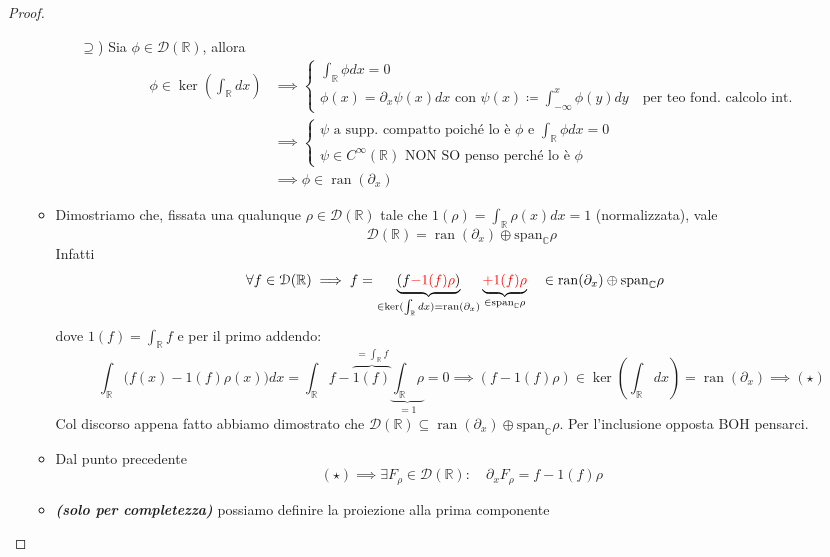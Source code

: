 \documentclass[a4paper,10pt]{article}
\theoremstyle{definition}
\DeclareMathOperator*{\ran}{ran}
\newcommand{\re}{\mathbb{R}} %
\newcommand{\im}{\mathbb{C}} %
\theoremstyle{indentdefinition}
\theoremstyle{indenttheorem}
\theoremstyle{myremark}
\theoremstyle{indentgeneral}
\begin{document}
\begin{proof}
\begin{itemize}
\begin{itemize}
\begin{itemize}
            \item[\underline{$\supseteq$})]  Sia $\phi\in \mathcal{D}(\re)$, allora
            \begin{align*}
                \phi\in\ker(\int_\re dx)&\implies\begin{cases}
                    \int_\re\phi dx=0\\
                    \phi(x)=\partial_x\psi(x)dx \text{ con }\psi(x)\coloneqq\int_{-\infty}^x\phi(y)dy \quad \text{per teo fond. calcolo int.}
                \end{cases}\\
                &\implies\begin{cases}
                    \psi \text{ a supp. compatto poiché lo è $\phi$ e $\int_\re\phi dx=0$}\\
                    \psi \in C^\infty(\re)\text{ NON SO penso perché lo è $\phi$}
                \end{cases}\\
                &\implies\phi\in\ran(\partial_x)
            \end{align*}
        \end{itemize}
        \item Dimostriamo che, fissata una qualunque $\rho\in\mathcal{D}(\re)$ tale che $1(\rho)=\int_\re\rho(x)dx=1$ (normalizzata), vale
        $$\boxed{\mathcal{D}(\re)=\ran(\partial_x)\oplus\text{span}_\im\rho}$$
        Infatti
        \begin{align*}
            \forall f\in\mathcal{D}(\re)&\implies f=\underbrace{(f\textcolor{red}{-1(f)\rho})}_{\in\ker(\int_\re dx)=\ran(\partial_x)}\underbrace{\textcolor{red}{+1(f)\rho}}_{\in\text{span}_\im\rho}\quad\in \ran(\partial_x)\oplus\text{span}_\im\rho
        \end{align*}
        dove $1(f)=\int_\re f$ e per il primo addendo:
        $$\int_\re\bigg(f(x)-1(f)\rho(x)\bigg)dx=\int_\re f-\overbrace{1(f)}^{=\int_\re f}\underbrace{\int_\re\rho}_{=1}=0\implies(f-1(f)\rho)\in\ker(\int_\re dx)=\ran(\partial_x)\implies (\star)$$
        Col discorso appena fatto abbiamo dimostrato che $\mathcal{D}(\re)\subseteq\ran(\partial_x)\oplus\text{span}_\im\rho $. Per l'inclusione opposta BOH pensarci. 
        \item Dal punto precedente
        $$(\star)\implies \exists F_\rho\in\mathcal{D}(\re):\quad \boxed{\partial_x F_\rho=f-1(f)\rho}$$
        \item \textbf{\textit{(solo per completezza)}} possiamo definire la proiezione alla prima componente

\end{itemize}
\end{itemize}
\end{proof}
\end{document}
